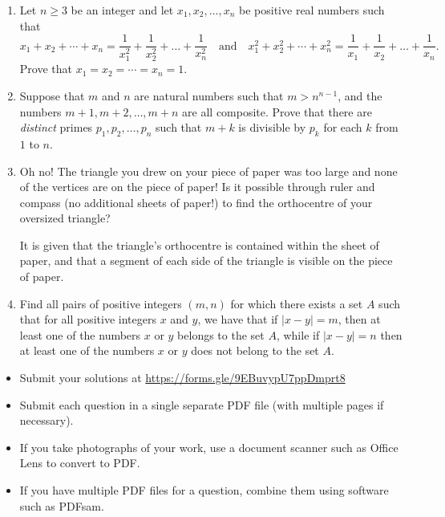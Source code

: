 \documentclass{article}
\begin{document}
\begin{enumerate}[itemsep=\fill]
\item %
Let $n \geq 3$ be an integer and let $x_1, x_2, \dotsc, x_n$ be positive real numbers such that
\[ x_1 + x_2 + \dotsb + x_n = \frac{1}{x_1^2} + \frac{1}{x_2^2} +\dotsc + \frac{1}{x_n^2} \quad \text{and} \quad x_1^2 + x_2^2 + \dotsb + x_n^2 = \frac{1}{x_1} + \frac{1}{x_2} +\dotsc + \frac{1}{x_n}. \]
Prove that $x_1 = x_2 = \dotsb = x_n =1$.


\item %
Suppose that $m$ and $n$ are natural numbers such that $m > n^{n - 1}$, and the numbers $m + 1, m + 2, \dots, m + n$ are all composite. Prove that there are \emph{distinct} primes $p_1, p_2, \dots, p_n$ such that $m + k$ is divisible by $p_k$ for each $k$ from $1$ to $n$.


\item %
Oh no! The triangle you drew on your piece of paper was too large and none of the vertices are on the piece of paper!
Is it possible through ruler and compass (no additional sheets of paper!) to find the orthocentre of your oversized triangle?

It is given that the triangle's orthocentre is contained within the sheet of paper, and that a segment of each side of the triangle is visible on the piece of paper. 


\item %
Find all pairs of positive integers $(m, n)$ for which there exists a set $A$ such that for all positive integers $x$ and $y$, we have that if $|x - y| = m$, then at least one of the numbers $x$ or $y$ belongs to the set $A$, while if $|x - y| = n$ then at least one of the numbers $x$ or $y$ does not belong to the set $A$.


\end{enumerate}


\vfill
\small
\begin{itemize}
	\item Submit your solutions at \href{https://forms.gle/9EBuvypU7ppDmprt8}{https://forms.gle/9EBuvypU7ppDmprt8}
	\item Submit each question in a single separate PDF file (with multiple pages if necessary).
	\item If you take photographs of your work, use a document scanner such as Office Lens to convert to PDF.
	\item If you have multiple PDF files for a question, combine them using software such as PDFsam.
\end{itemize}


\end{document}

